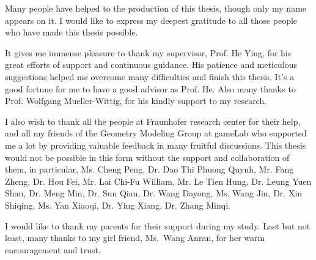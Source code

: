 Many people have helped to the production of this thesis, though only my name appears on it. I would like to express my deepest gratitude to all those people who have made this thesis possible.

It gives me immense pleasure to thank my supervisor, Prof. He Ying, for his great efforts of support and continuous guidance. His patience and meticulous suggestions helped me overcome many difficulties and finish this thesis. It's a good fortune for me to have a good advisor as Prof. He. Also many thanks to Prof. Wolfgang Mueller-Wittig, for his kindly support to my research.

I also wish to thank all the people at Fraunhofer research center for their help, and
all my friends of the Geometry Modeling Group at gameLab who supported me a lot
by providing valuable feedback in many fruitful discussions. This thesis would not
be possible in this form without the support and collaboration of them, in particular, Ms. Cheng Peng, Dr. Dao Thi Phuong Quynh, Mr. Fang Zheng, Dr. Hou Fei, Mr. Lai Chi-Fu William, Mr. Le Tien Hung, Dr. Leung Yuen Shan, Dr. Meng Min, Dr. Sun Qian, Dr. Wang Dayong, Ms. Wang Jin, Dr. Xin Shiqing, Ms. Yan Xiaoqi, Dr. Ying Xiang, Dr. Zhang Minqi.

I would like to thank my parents for their support during my study. Last but not least,
many thanks to my girl friend, Ms.~Wang Anran, for her warm encouragement and trust. 